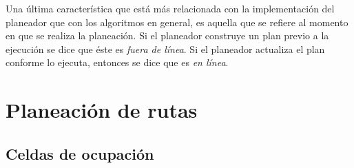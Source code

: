 \documentclass[letterpaper,12pt]{article}
\begin{document}
Una última característica que está más relacionada con la implementación del planeador que con los algoritmos en general, es aquella que se refiere al momento en que se realiza la planeación. Si el planeador construye un plan previo a la ejecución se dice que éste es \textit{fuera de línea}. Si el planeador actualiza el plan conforme lo ejecuta, entonces se dice que es \textit{en línea}.

\section{Planeación de rutas}
\label{sec:PathPlanning}
\subsection{Celdas de ocupación}
\end{document}
